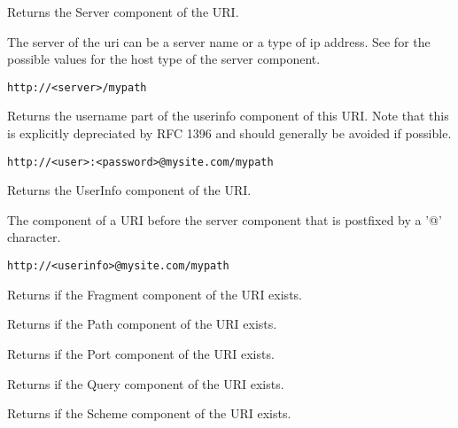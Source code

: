 Returns the Server component of the URI.

The server of the uri can be a server name or 
a type of ip address.  See
 for the
possible values for the host type of the 
server component.

\tt{http://<server>/mypath}


\label{wxurigetuser}


Returns the username part of the userinfo component of
this URI.  Note that this is explicitly depreciated by
RFC 1396 and should generally be avoided if possible.

\tt{http://<user>:<password>@mysite.com/mypath}


\label{wxurigetuserinfo}


Returns the UserInfo component of the URI.

The component of a URI before the server component
that is postfixed by a '@' character.

\tt{http://<userinfo>@mysite.com/mypath}


\label{wxurihasfragment}


Returns \true if the Fragment component of the URI exists.


\label{wxurihaspath}


Returns \true if the Path component of the URI exists.


\label{wxurihasport}


Returns \true if the Port component of the URI exists.


\label{wxurihasquery}


Returns \true if the Query component of the URI exists.


\label{wxurihasscheme}


Returns \true if the Scheme component of the URI exists.


